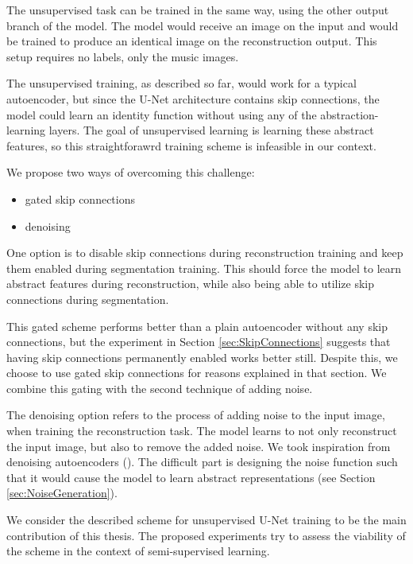 The unsupervised task can be trained in the same way, using the other output branch of the model. The model would receive an image on the input and would be trained to produce an identical image on the reconstruction output. This setup requires no labels, only the music images.

The unsupervised training, as described so far, would work for a typical autoencoder, but since the U-Net architecture contains skip connections, the model could learn an identity function without using any of the abstraction-learning layers. The goal of unsupervised learning is learning these abstract features, so this straightforawrd training scheme is infeasible in our context.

We propose two ways of overcoming this challenge:

\begin{itemize}
    \item gated skip connections
    \item denoising
\end{itemize}

One option is to disable skip connections during reconstruction training and keep them enabled during segmentation training. This should force the model to learn abstract features during reconstruction, while also being able to utilize skip connections during segmentation.

This gated scheme performs better than a plain autoencoder without any skip connections, but the experiment in Section \ref{sec:SkipConnections} suggests that having skip connections permanently enabled works better still. Despite this, we choose to use gated skip connections for reasons explained in that section. We combine this gating with the second technique of adding noise.

The denoising option refers to the process of adding noise to the input image, when training the reconstruction task. The model learns to not only reconstruct the input image, but also to remove the added noise. We took inspiration from denoising autoencoders (\cite{StackedDenoisingAutoencoders}). The difficult part is designing the noise function such that it would cause the model to learn abstract representations (see Section \ref{sec:NoiseGeneration}).

We consider the described scheme for unsupervised U-Net training to be the main contribution of this thesis. The proposed experiments try to assess the viability of the scheme in the context of semi-supervised learning.

